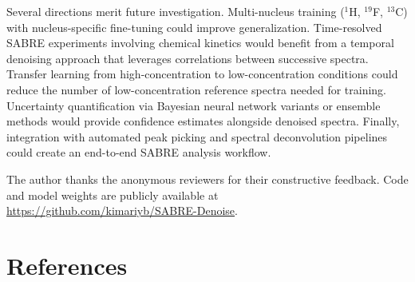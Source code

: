 \documentclass{article}
\begin{document}
Several directions merit future investigation. Multi-nucleus training ($^1$H, $^{19}$F, $^{13}$C) with nucleus-specific fine-tuning could improve generalization. Time-resolved SABRE experiments involving chemical kinetics would benefit from a temporal denoising approach that leverages correlations between successive spectra. Transfer learning from high-concentration to low-concentration conditions could reduce the number of low-concentration reference spectra needed for training. Uncertainty quantification via Bayesian neural network variants or ensemble methods would provide confidence estimates alongside denoised spectra. Finally, integration with automated peak picking and spectral deconvolution pipelines could create an end-to-end SABRE analysis workflow.

\begin{ack}
The author thanks the anonymous reviewers for their constructive feedback. Code and model weights are publicly available at \url{https://github.com/kimariyb/SABRE-Denoise}.
\end{ack}

\clearpage
{}
\label{sec:refs_start}
\section*{References}
\end{document}
